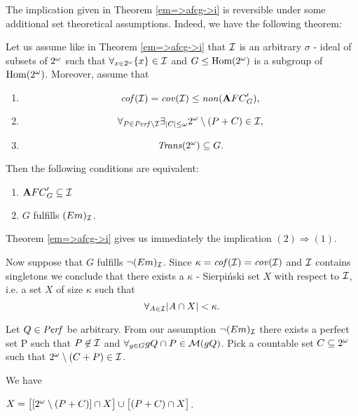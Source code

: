 \bigskip

The implication given in Theorem \ref{em=>afcg->i} is reversible
under some additional set theoretical assumptions.
Indeed, we have the following theorem:

\begin{theorem}
\label{em<=>afcg->i}
  Let us assume like in Theorem \ref{em=>afcg->i}
that ${\cal I}$ is an arbitrary $\sigma$ - ideal of subsets of $2^{\omega}$
such that $\forall_{x\in2^{\omega}} \lbrace x \rbrace \in {\cal I}$ and
$G \leq {\rm Hom(2^{\omega})}$ is a subgroup of ${\rm Hom(2^{\omega})}$.
  Moreover, assume that
\begin{enumerate}
  \item
    \[ {\it cof}({\cal I}) = {\it cov}({\cal I}) \leq {\it non}({\mathbf AFC}^\prime_{G}), \]
  \item
    \[ \forall_{P\in{\it Perf}\setminus{\cal I}} \exists_{|C| \leq \omega}
      2^{\omega} \setminus (P + C) \in {\cal I}, \]
  \item
    \[ {\it Trans}(2^{\omega}) \subseteq G. \]
\end{enumerate}

Then the following conditions are equivalent:

\begin{enumerate}
  \item
    ${\mathbf AFC}^\prime_{G} \subseteq {\cal I}$
  \item
    $G$ fulfills $(Em)_{{\cal I}}$.
\end{enumerate}
\end{theorem}

\proof

Theorem \ref{em=>afcg->i}
gives us immediately the implication $(2) \Rightarrow (1)$.


  Now suppose that $G$ fulfills $\neg (Em)_{{\cal I}}$.
Since $\kappa = {\it cof}({\cal I}) = {\it cov}({\cal I})$
and ${\cal I}$ contains singletons we conclude that
there exists a $\kappa$ - Sierpi\'nski set $X$ with
respect to ${\cal I}$, i.e. a set $X$ of size
$\kappa$ such that
  \[
    \forall_{A \in {\cal I}} |A \cap X| < \kappa.
  \]



Let $Q \in {\it Perf}$ be arbitrary.
From our assumption $\neg (Em)_{{\cal I}}$
there exists a perfect set P
such that $P \not\in {\cal I}$ and
$\forall_{g \in G} gQ \cap P \in {\cal M}(gQ)$.
  Pick a countable set $C \subseteq 2^{\omega}$ such that
$2^{\omega} \setminus (C+P) \in {\cal I}$.

We have

$X =
  \big[ [2^{\omega} \setminus (P+C) ] \cap X \big]
\cup
  \big[ (P+C) \cap X \big]$.

